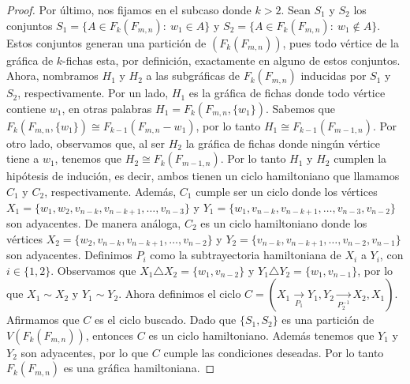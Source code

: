 \begin{proof}
        Por \'ultimo, nos fijamos en el subcaso donde $k>2$. Sean $S_1$ y $S_2$
        los conjuntos $S_1=\{A \in F_k(F_{m,n}) \colon\ w_1 \in A\}$ y $S_2=\{A
        \in F_k(F_{m,n}) \colon\ w_1 \notin A\}$. Estos conjuntos generan una
        partici\'on de $(F_k(F_{m,n}))$, pues todo v\'ertice de la gr\'afica de
        $k$-fichas esta, por definici\'on, exactamente en alguno de estos
        conjuntos. Ahora, nombramos $H_1$ y $H_2$ a las subgr\'aficas de
        $F_k(F_{m,n})$ inducidas por $S_1$ y $S_2$, respectivamente. Por un
        lado, $H_1$ es la gr\'afica de fichas donde todo v\'ertice contiene
        $w_1$, en otras palabras $H_1= F_k(F_{m,n},\{w_1\})$. Sabemos que
        $F_k(F_{m,n},\{w_1\}) \cong F_{k-1}(F_{m,n}- w_1)$, por lo tanto $H_1
        \cong F_{k-1}(F_{m-1,n})$. Por otro lado, observamos que, al ser $H_2$
        la gr\'afica de fichas donde ning\'un v\'ertice tiene a $w_1$, tenemos
        que $H_2 \cong F_k(F_{m-1,n})$. Por lo tanto $H_1$ y $H_2$ cumplen la
        hip\'otesis de induci\'on, es decir, ambos tienen un ciclo hamiltoniano
        que llamamos $C_1$ y $C_2$, respectivamente. Adem\'as, $C_1$ cumple ser
        un ciclo donde los v\'ertices $X_1 = \{w_1, w_2,v_{n-k},v_{n-k+1},
        \dots, v_{n-3}\}$ y $Y_1 = \{w_1,v_{n-k},v_{n-k+1}, \dots,
        v_{n-3},v_{n-2}\}$ son adyacentes. De manera an\'aloga, $C_2$ es un
        ciclo hamiltoniano donde los v\'ertices $X_2 = \{ w_2,v_{n-k},v_{n-k+1},
        \dots, v_{n-2}\}$ y $Y_2 = \{v_{n-k},v_{n-k+1}, \dots,
        v_{n-2},v_{n-1}\}$ son adyacentes. Definimos $P_i$ como la
        subtrayectoria hamiltoniana de $X_i$ a $Y_i$, con $i \in \{ 1,2 \}$.
        Observamos que $X_1 \triangle X_2 = \{w_1,v_{n-2}\}$ y $Y_1 \triangle
        Y_2 = \{w_1, v_{n-1}\}$, por lo que $X_1 \sim X_2$ y $Y_1 \sim Y_2$.
        Ahora definimos el ciclo $C = (X_1 \xrightarrow[P_1]{}Y_1,Y_2
        \xrightarrow[P_2^{-1}]{}X_2,X_1)$. Afirmamos que $C$ es el ciclo
        buscado. Dado que $\{S_1,S_2\}$ es una partici\'on de $V(F_k(F_{m,n}))$,
        entonces $C$ es un ciclo hamiltoniano. Adem\'as tenemos que $Y_1$ y
        $Y_2$ son adyacentes, por lo que $C$ cumple las condiciones deseadas.
        Por lo tanto $F_k(F_{m,n})$ es una gr\'afica hamiltoniana.
        \end{proof}